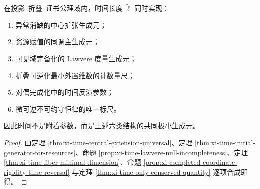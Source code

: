 \begin{theorem}[时间统一语义定理]\label{thm:xi-time-unified-semantic-generator}
在投影--折叠--证书公理域内，时间长度 \(\widetilde\ell\) 同时实现：
\begin{enumerate}
  \item 异常消缺的中心扩张生成元；
  \item 资源赋值的同调主生成元；
  \item 可见域完备化的 Lawvere 度量生成元；
  \item 折叠可逆化最小外置维数的计数量尺；
  \item 对偶完成化中的时间反演参数；
  \item 微可逆不可约守恒律的唯一标尺。
\end{enumerate}
因此时间不是附着参数，而是上述六类结构的共同极小生成元。
\end{theorem}

\begin{proof}
由定理 \ref{thm:xi-time-central-extension-universal}、定理 \ref{thm:xi-time-initial-generator-for-resources}、命题 \ref{prop:xi-time-lawvere-null-incompleteness}、定理 \ref{thm:xi-time-fiber-minimal-dimension}、命题 \ref{prop:xi-completed-coordinate-rigidity-time-reversal} 与定理 \ref{thm:xi-time-only-conserved-quantity} 逐项合成即得。
\end{proof}




\endinput

\begin{theorem}[模流即时间：长度余圈诱导的动力学唯一性]\label{thm:xi-modular-flow-equals-time-cocycle}
\leanverified{paper\_xi\_modular\_flow\_equals\_time\_cocycle}
设 \(\mathcal G\) 为由可审计投影词与证书等价生成的可测群胚，\(\widetilde\ell:\mathcal G\to\mathbb Z\) 为可加 \(1\)-余圈：
\[
\widetilde\ell(gh)=\widetilde\ell(g)+\widetilde\ell(h).
\]
记 \(\mathcal M:=W^\ast(\mathcal G)\)。
对任意 \(\lambda>0\)，定义权
\[
\varphi_\lambda(f):=\int_{\mathcal G} f(g)\,e^{-\lambda\widetilde\ell(g)}\,d\nu(g),\qquad f\in C_c(\mathcal G).
\]
则 Tomita--Takesaki 模自同构群满足
\[
(\sigma_t^{\varphi_\lambda}f)(g)=e^{it\lambda\widetilde\ell(g)}\,f(g).
\]
若取对象函数 \(b:\mathcal G^{(0)}\to\mathbb R\) 并作 gauge 变换，则 Connes 导数满足
\[
(D\varphi_{\lambda,b}:D\varphi_\lambda)_t(g)
=e^{it\lambda\,(b(r(g))-b(s(g)))}.
\]
故时间 gauge 自由度与 Connes \(1\)-余圈完全同一。
\end{theorem}


